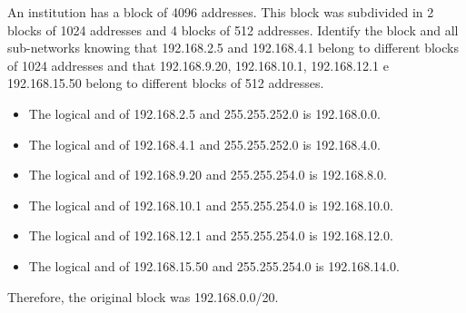\begin{Exercise}
An institution has a block of 4096 addresses.
This block was subdivided in 2 blocks of 1024 addresses and 4 blocks of 512 addresses.
Identify the block and all sub-networks knowing that 192.168.2.5 and 192.168.4.1 belong to different blocks of 1024 addresses and that 192.168.9.20, 192.168.10.1, 192.168.12.1 e 192.168.15.50 belong to different blocks of 512 addresses.
\end{Exercise}
\begin{Answer}
\begin{itemize}
\item The logical and of 192.168.2.5 and 255.255.252.0 is 192.168.0.0.
\item The logical and of 192.168.4.1 and 255.255.252.0 is 192.168.4.0.
\item The logical and of 192.168.9.20 and 255.255.254.0 is 192.168.8.0.
\item The logical and of 192.168.10.1 and 255.255.254.0 is 192.168.10.0.
\item The logical and of 192.168.12.1 and 255.255.254.0 is 192.168.12.0.
\item The logical and of 192.168.15.50 and 255.255.254.0 is 192.168.14.0.
\end{itemize}
Therefore, the original block was 192.168.0.0/20.
\end{Answer}

\begin{Exercise}
\end{Exercise}

